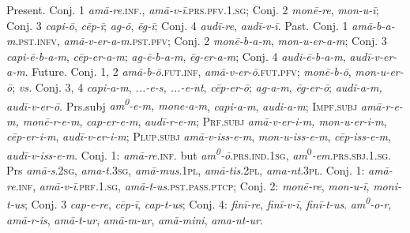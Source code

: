 \documentclass[output=paper, colorlinks,citecolor=brown]{langsci/langscibook}
\begin{document}
\ea \label{ex:andersen_7}
\ea\label{ex:andersen_7a}
      Present. Conj. 1 \textit{amā-re}.\textsc{inf}., \textit{amā-v-ī}.\textsc{prs.pfv.1.sg}; Conj. 2 \textit{monē-re}, \textit{mon-u-ī}; Conj. 3 \textit{capi-ō}, \textit{cēp-ī}; \textit{ag-ō}, \textit{ēg-ī}; Conj. 4 \textit{audī-re}, \textit{audī-v-ī}.
\ex \label{ex:andersen_7b}
      Past. Conj. 1 \textit{amā-b-a-m}.\textsc{pst.infv}, \textit{amā-v-er-a-m}.\textsc{pst.pfv}; Conj. 2 \textit{monē-b-a-m}, \textit{mon-u-er-a-m}; Conj. 3 \textit{capi-ē-b-a-m}, \textit{cēp-er-a-m}; \textit{ag-ē-b-a-m}, \textit{ēg-er-a-m}; Conj. 4 \textit{audi-ē-b-a-m}, \textit{audī-v-er-a-m}.
\ex \label{ex:andersen_7c}
      Future. Conj. 1, 2 \textit{amā-b-ō}.\textsc{fut.inf}, \textit{amā-v-er-ō}.\textsc{fut.pfv}; \textit{monē-b-ō}, \textit{mon-u-er-ō}; \textit{vs.} Conj. 3, 4 \textit{capi-a-m}, \textit{...-e-s, ...-e-nt}, \textit{cēp-er-ō}; \textit{ag-a-m}, \textit{ēg-er-ō}; \textit{audi-a-m,} \textit{audī-v-er-ō}.
\ex \label{ex:andersen_7d}
      Prs.subj \textit{am\textsuperscript{0}}\textit{{}-e-m, mone-a-m}, \textit{capi-a-m}, \textit{audi-a-m}; \textsc{Impf.subj} \textit{amā-r-e-m, monē-r-e-m}, \textit{cap-er-e-m}, \textit{audī-r-e-m}; \textsc{Prf.subj} \textit{amā-v-er-i-m, mon-u-er-i-m}, \textit{cēp-er-i-m}, \textit{audī-v-er-i-m}; \textsc{Plup.subj} \textit{amā-v-iss-e-m}, \textit{mon-u-iss-e-m}, \textit{cēp-iss-e-m}, \textit{audī-v-iss-e-m}.
\ex \label{ex:andersen_7e}
      Conj. 1: \textit{amā-re}.\textsc{inf}. but \textit{am\textsuperscript{0}}\textit{{}-ō}.\textsc{prs.ind.1sg}, \textit{am}\textsuperscript{0}\textit{{}-em}.\textsc{prs.sbj.1.sg}.
\ex \label{ex:andersen_7f}
      Prs \textit{amā-s}.\textsc{2sg}, \textit{ama-t}.\textsc{3sg}, \textit{amā-mus}.\textsc{1pl}, \textit{amā-tis}.\textsc{2pl}, \textit{ama-nt}.\textsc{3pl}.
\ex \label{ex:andersen_7g}
      Conj. 1: \textit{amā-re}.\textsc{inf}, \textit{amā-v-ī}.\textsc{prf.1.sg}, \textit{amā-t-us}.\textsc{pst.pass.ptcp}; Conj. 2: \textit{monē-re}, \textit{mon-u-ī}, \textit{moni-t-us}; Conj. 3 \textit{cap-e-re}, \textit{cēp-ī}, \textit{cap-t-us}; Conj. 4: \textit{finī-re}, \textit{finī-v-ī}, \textit{finī-t-us}.
\ex \label{ex:andersen_7h}
      \textit{am\textsuperscript{0}}\textit{{}-o-r}, \textit{amā-r-is}, \textit{amā-t-ur}, \textit{amā-m-ur}, \textit{amā-mini}, \textit{ama-nt-ur}.
\z
\z
\end{document}
